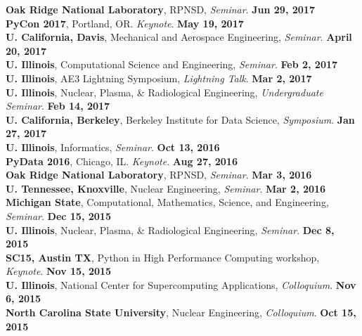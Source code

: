 \documentclass[margin,line]{resume}
\begin{document}
\begin{resume}
      \textbf{Oak Ridge National Laboratory}, RPNSD, \emph{Seminar}.  \hfill\textbf{Jun 29, 2017}\\
      \textbf{PyCon 2017}, Portland, OR. \emph{Keynote}.  \hfill\textbf{May 19, 2017}\\
      \textbf{U. California, Davis}, Mechanical and Aerospace Engineering, \emph{Seminar}.  \hfill\textbf{April 20, 2017}\\
      \textbf{U. Illinois}, Computational Science and Engineering, \emph{Seminar}.  \hfill\textbf{Feb 2, 2017}\\
      \textbf{U. Illinois}, AE3 Lightning Symposium, \emph{Lightning Talk}.  \hfill\textbf{Mar 2, 2017}\\
      \textbf{U. Illinois}, Nuclear, Plasma, \& Radiological Engineering, \emph{Undergraduate Seminar}.  \hfill\textbf{Feb 14, 2017}\\
      \textbf{U. California, Berkeley}, Berkeley Institute for Data Science, \emph{Symposium}.  \hfill\textbf{Jan 27, 2017}\\
      \textbf{U. Illinois}, Informatics, \emph{Seminar}.  \hfill\textbf{Oct 13, 2016}\\
      \textbf{PyData 2016}, Chicago, IL. \emph{Keynote}.  \hfill\textbf{Aug 27, 2016}\\
      \textbf{Oak Ridge National Laboratory}, RPNSD, \emph{Seminar}.  \hfill\textbf{Mar 3, 2016}\\
      \textbf{U. Tennessee, Knoxville}, Nuclear Engineering, \emph{Seminar}.  \hfill\textbf{Mar 2, 2016}\\
      \textbf{Michigan State}, Computational, Mathematics, Science, and Engineering, \emph{Seminar}.  \hfill\textbf{Dec 15, 2015}\\
      \textbf{U. Illinois}, Nuclear, Plasma, \& Radiological Engineering, \emph{Seminar}.          \hfill\textbf{Dec 8, 2015}\\
      \textbf{SC15, Austin TX}, Python in High Performance Computing workshop, \emph{Keynote}.     \hfill\textbf{Nov 15, 2015}\\
      \textbf{U. Illinois}, National Center for Supercomputing Applications, \emph{Colloquium}.    \hfill\textbf{Nov 6, 2015}\\
      \textbf{North Carolina State University}, Nuclear Engineering, \emph{Colloquium}.            \hfill\textbf{Oct 15, 2015}\\

\end{resume}
\end{document}

